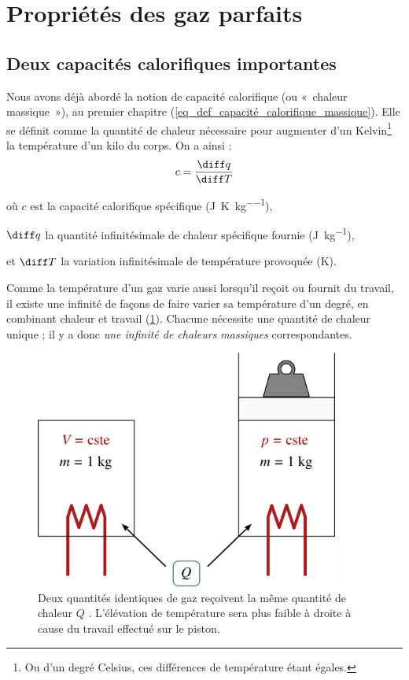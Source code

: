 \section{Propriétés des gaz parfaits}

	\subsection{Deux capacités calorifiques importantes}

		Nous avons déjà abordé la notion de capacité calorifique (ou «~chaleur massique~»), au premier chapitre (\ref{eq_def_capacité_calorifique_massique}). Elle se définit comme la quantité de chaleur nécessaire pour augmenter d’un Kelvin\footnote{Ou d’un degré Celsius, ces différences de température étant égales.}
		la température d’un kilo du corps. On a ainsi :
		\begin{equation}
			c = \frac{\diff q}{\diff T}
		\end{equation}
		
		\begin{equationterms}
			\item où \tab $c$ 		\tab\tab est la capacité calorifique spécifique (\si{\joule\per\kelvin\per\kilogram}),
			\item 	\tab $\diff q$ \tab la quantité infinitésimale de chaleur spécifique fournie (\si{\joule\per\kilogram}),
			\item et \tab $\diff T$ \tab la variation infinitésimale de température provoquée (\si{\kelvin}).
		\end{equationterms}

		Comme la température d’un gaz varie aussi lorsqu’il reçoit ou fournit du travail, il existe une infinité de façons de faire varier sa température d’un degré, en combinant chaleur et travail (\cref{fig_expérience_diff_chaleurs_massiques}). Chacune nécessite une quantité de chaleur unique ; il y a donc \textit{une infinité de chaleurs massiques} correspondantes. 

		\begin{figure}
			\begin{center}
				\includegraphics[width=10cm]{images/difference_capacites_calorifiques.png}
			\end{center}
			\caption{Deux quantités identiques de gaz reçoivent la même quantité de chaleur $Q$ . L’élévation de température sera plus faible à droite à cause du travail effectué sur le piston.}
			\label{fig_expérience_diff_chaleurs_massiques}
		\end{figure}

